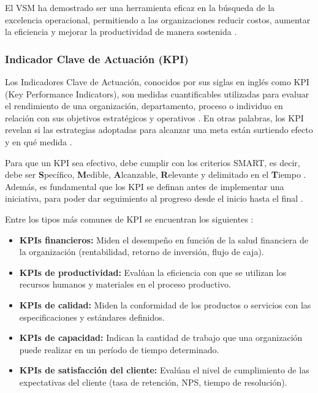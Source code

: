 \documentclass[12pt, letterpaper]{article}
\begin{document}
El VSM ha demostrado ser una herramienta eficaz en la búsqueda de la excelencia operacional,
permitiendo a las organizaciones reducir costos, aumentar la eficiencia y mejorar la productividad
de manera sostenida \cite{kaizen2025}.

\subsubsection{Indicador Clave de Actuación (KPI)}

Los Indicadores Clave de Actuación, conocidos por sus siglas en inglés como KPI (Key Performance
Indicators), son medidas cuantificables utilizadas para evaluar el rendimiento de una organización,
departamento, proceso o individuo en relación con sus objetivos estratégicos y operativos \cite{escadia2024}.
En otras palabras, los KPI revelan si las estrategias adoptadas para alcanzar una meta están
surtiendo efecto y en qué medida \cite{asana2026}.

Para que un KPI sea efectivo, debe cumplir con los criterios SMART, es decir, debe ser
\textbf{S}pecífico, \textbf{M}edible, \textbf{A}lcanzable, \textbf{R}elevante y delimitado en el
\textbf{T}iempo \cite{escadia2024}. Además, es fundamental que los KPI se definan antes de
implementar una iniciativa, para poder dar seguimiento al progreso desde el inicio hasta el final
\cite{asana2026}.

Entre los tipos más comunes de KPI se encuentran los siguientes \cite{escadia2024,zendesk2026}:

\begin{itemize}[leftmargin=1.5em, itemsep=2pt]
  \item \textbf{KPIs financieros:} Miden el desempeño en función de la salud financiera de la
        organización (rentabilidad, retorno de inversión, flujo de caja).
  \item \textbf{KPIs de productividad:} Evalúan la eficiencia con que se utilizan los recursos
        humanos y materiales en el proceso productivo.
  \item \textbf{KPIs de calidad:} Miden la conformidad de los productos o servicios con las
        especificaciones y estándares definidos.
  \item \textbf{KPIs de capacidad:} Indican la cantidad de trabajo que una organización puede
        realizar en un período de tiempo determinado.
  \item \textbf{KPIs de satisfacción del cliente:} Evalúan el nivel de cumplimiento de las
        expectativas del cliente (tasa de retención, NPS, tiempo de resolución).
\end{itemize}
\end{document}
